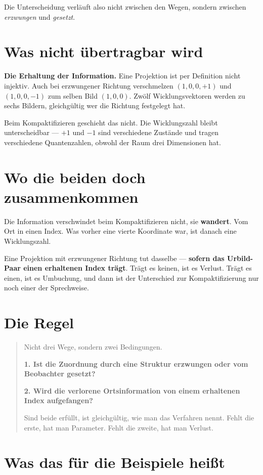 Die Unterscheidung verläuft also nicht zwischen den Wegen, sondern
zwischen \emph{erzwungen} und \emph{gesetzt}.

\section{Was nicht übertragbar wird}

\textbf{Die Erhaltung der Information.} Eine Projektion ist per
Definition nicht injektiv. Auch bei erzwungener Richtung verschmelzen
$(1,0,0,+1)$ und $(1,0,0,-1)$ zum selben Bild $(1,0,0)$. Zwölf
Wicklungsvektoren werden zu sechs Bildern, gleichgültig wer die
Richtung festgelegt hat.

Beim Kompaktifizieren geschieht das nicht. Die Wicklungszahl bleibt
unterscheidbar --- $+1$ und $-1$ sind verschiedene Zustände und tragen
verschiedene Quantenzahlen, obwohl der Raum drei Dimensionen hat.

\section{Wo die beiden doch zusammenkommen}

Die Information verschwindet beim Kompaktifizieren nicht, sie
\textbf{wandert}. Vom Ort in einen Index. Was vorher eine vierte
Koordinate war, ist danach eine Wicklungszahl.

Eine Projektion mit erzwungener Richtung tut dasselbe --- \textbf{sofern
das Urbild-Paar einen erhaltenen Index trägt}. Trägt es keinen, ist es
Verlust. Trägt es einen, ist es Umbuchung, und dann ist der Unterschied
zur Kompaktifizierung nur noch einer der Sprechweise.

\section{Die Regel}

\begin{quote}
Nicht drei Wege, sondern zwei Bedingungen.

\textbf{1. Ist die Zuordnung durch eine Struktur erzwungen oder vom
Beobachter gesetzt?}

\textbf{2. Wird die verlorene Ortsinformation von einem erhaltenen
Index aufgefangen?}

Sind beide erfüllt, ist gleichgültig, wie man das Verfahren nennt.
Fehlt die erste, hat man Parameter. Fehlt die zweite, hat man Verlust.
\end{quote}

\section{Was das für die Beispiele heißt}

